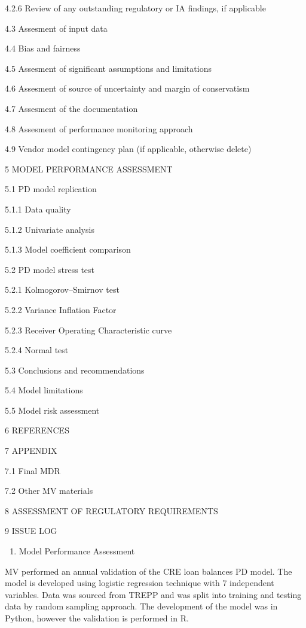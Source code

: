 4.2.6 Review of any outstanding regulatory or IA findings, if applicable

4.3 Assesment of input data

4.4 Bias and fairness

4.5 Assesment of significant assumptions and limitations

4.6 Assesment of source of uncertainty and margin of conservatism

4.7 Assesment of the documentation

4.8 Assesment of performance monitoring approach

4.9 Vendor model contingency plan (if applicable, otherwise delete)

5 MODEL PERFORMANCE ASSESSMENT

5.1 PD model replication

5.1.1 Data quality

5.1.2 Univariate analysis

5.1.3 Model coefficient comparison

5.2 PD model stress test

5.2.1 Kolmogorov--Smirnov test

5.2.2 Variance Inflation Factor

5.2.3 Receiver Operating Characteristic curve

5.2.4 Normal test

5.3 Conclusions and recommendations

5.4 Model limitations

5.5 Model risk assessment

6 REFERENCES

7 APPENDIX

7.1 Final MDR

7.2 Other MV materials

8 ASSESSMENT OF REGULATORY REQUIREMENTS

9 ISSUE LOG

\begin{enumerate}
\def\labelenumi{\arabic{enumi}.}
\setcounter{enumi}{4}
\tightlist
\item
  Model Performance Assessment
\end{enumerate}

MV performed an annual validation of the CRE loan balances PD model. The
model is developed using logistic regression technique with 7
independent variables. Data was sourced from TREPP and was split into
training and testing data by random sampling approach. The development
of the model was in Python, however the validation is performed in R.

